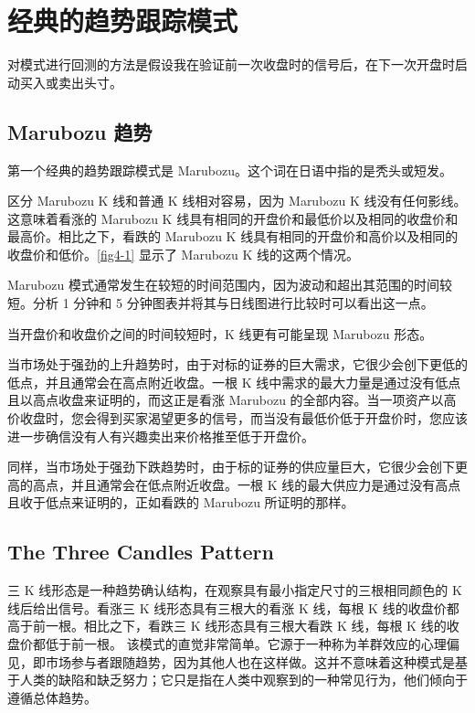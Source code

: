 \chapter{经典的趋势跟踪模式\label{ch04}}
\begin{tcolorbox}
    对模式进行回测的方法是假设我在验证前一次收盘时的信号后，在下一次开盘时启动买入或卖出头寸。
\end{tcolorbox}
\section{Marubozu 趋势}
第一个经典的趋势跟踪模式是 Marubozu。这个词在日语中指的是秃头或短发。

区分 Marubozu K 线和普通 K 线相对容易，因为 Marubozu K 线没有任何影线。这意味着看涨的 Marubozu K 线具有相同的开盘价和最低价以及相同的收盘价和最高价。相比之下，看跌的 Marubozu K 线具有相同的开盘价和高价以及相同的收盘价和低价。\autoref{fig4-1} 显示了 Marubozu K 线的这两个情况。


Marubozu 模式通常发生在较短的时间范围内，因为波动和超出其范围的时间较短。分析 1 分钟和 5 分钟图表并将其与日线图进行比较时可以看出这一点。
\begin{tcolorbox}
    当开盘价和收盘价之间的时间较短时，K 线更有可能呈现 Marubozu 形态。
\end{tcolorbox}

当市场处于强劲的上升趋势时，由于对标的证券的巨大需求，它很少会创下更低的低点，并且通常会在高点附近收盘。一根 K 线中需求的最大力量是通过没有低点且以高点收盘来证明的，而这正是看涨 Marubozu 的全部内容。当一项资产以高价收盘时，您会得到买家渴望更多的信号，而当没有最低价低于开盘价时，您应该进一步确信没有人有兴趣卖出来价格推至低于开盘价。

同样，当市场处于强劲下跌趋势时，由于标的证券的供应量巨大，它很少会创下更高的高点，并且通常会在低点附近收盘。一根 K 线的最大供应力是通过没有高点且收于低点来证明的，正如看跌的 Marubozu 所证明的那样。
\section{The Three Candles Pattern}
三 K 线形态是一种趋势确认结构，在观察具有最小指定尺寸的三根相同颜色的 K 线后给出信号。看涨三 K 线形态具有三根大的看涨 K 线，每根 K 线的收盘价都高于前一根。相比之下，看跌三 K 线形态具有三根大看跌 K 线，每根 K 线的收盘价都低于前一根。
该模式的直觉非常简单。它源于一种称为羊群效应的心理偏见，即市场参与者跟随趋势，因为其他人也在这样做。这并不意味着这种模式是基于人类的缺陷和缺乏努力；它只是指在人类中观察到的一种常见行为，他们倾向于遵循总体趋势。

